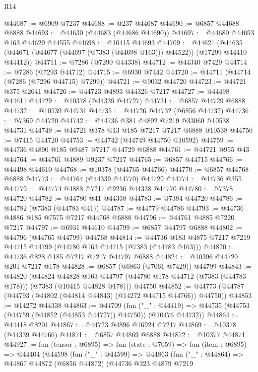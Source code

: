 \begin{lexlean}{R14}
\begin{coremodule}
@44687 := @6909 @7237
@44688 := @237 @44687
@44690 := @6857 @44688 @6888
@44693 := @44630 (@44683 (@44686 @44690))
@44697 := @44680 @44693 @163 @44629 @44555
@44698 := @10415 @44693
@44709 := @44621
    (@44635 (@44671 (@44677 (@44697 (@7383 (@44698 @163))) @44522)) (@17299 @44410 @44412))
@44711 := @7286 (@7290 @44338)
@44712 := @44340 @7429
@44714 := @7286 (@7293 @44712)
@44715 := @6930 @7442
@44720 := @44711 (@44714 (@7286 (@7296 @44715) @7299))
@44721 := @9032 @44720
@44723 := @44721 @375 @2641
@44726 := @44723 @4893 @44326 @7217
@44727 := @44498 @44611
@44729 := @10378 (@44339 @44727)
@44731 := @6857 @44729 @6888
@44732 := @10539 @44731
@44735 := @44726 @44732 (@6856 @44732)
@44736 := @7369 @44720
@44742 := @44736 @381 @4892 @7219 @33060 @10538 @44731
@44749 := @44721 @378 @13 @185 @7217 @7217 @6888 @10538
@44750 := @7415 @44720
@44753 := @44742 (@44749 @44750 @10592)
@44759 := @44736 @4890 @185 @9487 @7217 @44729 @6888
@44761 := @44721 @955 @43
@44764 := @44761 @4889 @9237 @7217
@44765 := @6857 @44715
@44766 := @44498 @44610
@44768 := @10378 (@44765 @44766)
@44770 := @6857 @44768 @6888
@44773 := @44764 (@44339 @44770) @44729
@44774 := @44736 @355
@44779 := @44774 @4888 @7217 @9236 @44338 @44770
@44780 := @7378 @44720
@44782 := @44780 @41 @44338
@44783 := @7384 @44720
@44786 := @44782 (@7383 (@44783 @41))
@44787 := @44779 @44786
@44793 := @44736 @4886 @185 @7575 @7217 @44768 @6888
@44796 := @44761 @4885 @7220 @7217
@44797 := @6931 @44610
@44799 := @6857 @44797 @6888
@44802 := @44796 (@44765 @44799) @44768
@44814 := @44736 @183 @4875 @7217 @7219 @44715 @44799 (@44780 @163 @44715 (@7383 (@44783 @163)))
@44820 := @44736 @828 @185 @7217 @7217 @44797 @6888
@44824 := @10396 @44720 @201 @7217 @178
@44828 := @6857 (@6863 (@7061 @7429)) @44799
@44843 := @44820
    (@44824
      @44828
      @163
      @44797
      (@44780 @178 @44712 (@7383 (@44783 @178)))
      (@7383 (@10415 @44828 @178)))
    @44750
@44852 := @44773 (@44787 (@44793 (@44802 (@44814 @44843) (@14272 @44715 @44766)) @44750))
@44853 := @14272 @44338
@44863 := @44709
    (fun ("_" : @44419) => @44735 (@44753 (@44759 (@44852 (@44853 @44727)) @44750)) (@10476 @44732))
@44864 := @44418 @8201
@44867 := @44723 @4896 @16924 @7217
@44869 := @10378 (@44339 @44766)
@44871 := @6857 @44869 @6888
@44872 := @10377 @44871
@44927 := fun (tensor : @6895) =>
  fun (state : @7059) =>
  fun (item : @6895) =>
  @44404
    (@44598
      (fun ("_" : @44599) =>
      @44863
        (fun ("_" : @44864) =>
        @44867
          @44872
          (@6856 @44872)
          (@44736
            @323
            @4879
            @7219

\end{coremodule}
\end{lexlean}
